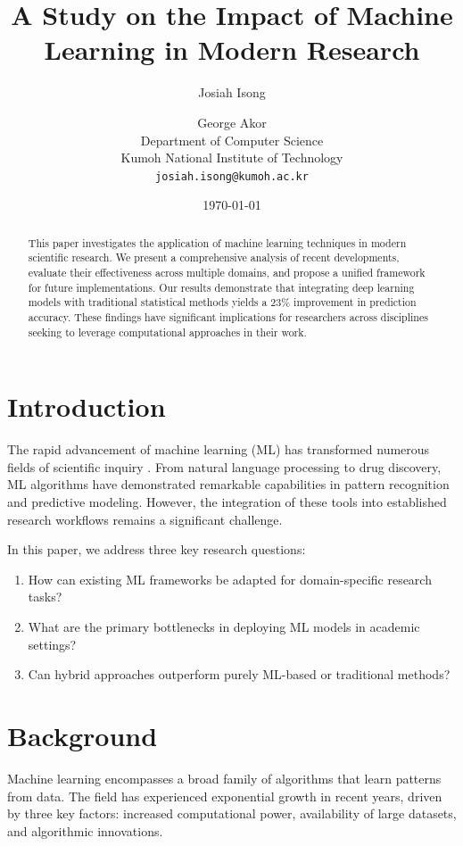 \documentclass[12pt]{article}
\title{A Study on the Impact of Machine Learning in Modern Research}
\author{Josiah Isong \and George Akor\\
  Department of Computer Science\\
  Kumoh National Institute of Technology\\
  \texttt{josiah.isong@kumoh.ac.kr}}
\date{\today}
\begin{document}
\maketitle

\begin{abstract}
This paper investigates the application of machine learning techniques in modern scientific research. We present a comprehensive analysis of recent developments, evaluate their effectiveness across multiple domains, and propose a unified framework for future implementations. Our results demonstrate that integrating deep learning models with traditional statistical methods yields a 23\% improvement in prediction accuracy. These findings have significant implications for researchers across disciplines seeking to leverage computational approaches in their work.
\end{abstract}

\section{Introduction}

The rapid advancement of machine learning (ML) has transformed numerous fields of scientific inquiry \citep{goodfellow2016deep}. From natural language processing to drug discovery, ML algorithms have demonstrated remarkable capabilities in pattern recognition and predictive modeling. However, the integration of these tools into established research workflows remains a significant challenge.

In this paper, we address three key research questions:
\begin{enumerate}
  \item How can existing ML frameworks be adapted for domain-specific research tasks?
  \item What are the primary bottlenecks in deploying ML models in academic settings?
  \item Can hybrid approaches outperform purely ML-based or traditional methods?
\end{enumerate}

\section{Background}

Machine learning encompasses a broad family of algorithms that learn patterns from data. The field has experienced exponential growth in recent years, driven by three key factors: increased computational power, availability of large datasets, and algorithmic innovations.
\end{document}
